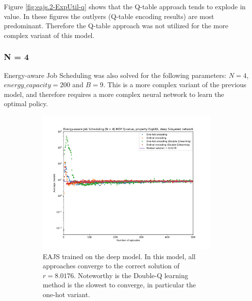 Figure \ref{fig:eajs.2-ExpUtil-q} shows that the Q-table approach tends to explode in value. In these figures the outlyers (Q-table encoding results) are most predominant. Therefore the Q-table approach was not utilized for the more complex variant of this model.

\subsubsection*{N = 4}
Energy-aware Job Scheduling was also solved for the following parameters: $N = 4$, $energy\_capacity = 200$ and $B = 9$. This is a more complex variant of the previous model, and therefore requires a more complex neural network to learn the optimal policy.

\begin{figure}
    \centering
    \begin{subfigure}[b]{0.9\textwidth}
        \centering
        \includegraphics[width=\textwidth]{plot/eajs.4-ExpUtil-q.pdf}
        \caption{EAJS trained on the deep model. In this model, all approaches converge to the correct solution of $r = 8.0176$. Noteworthy is the Double-Q learning method is the slowest to converge, in particular the one-hot variant.}
        \label{fig:eajs.4-ExpUtil-deep-q}
    \end{subfigure}
    \vfill
    \begin{subfigure}[b]{0.9\textwidth}
        \centering

\end{subfigure}
\end{figure}
